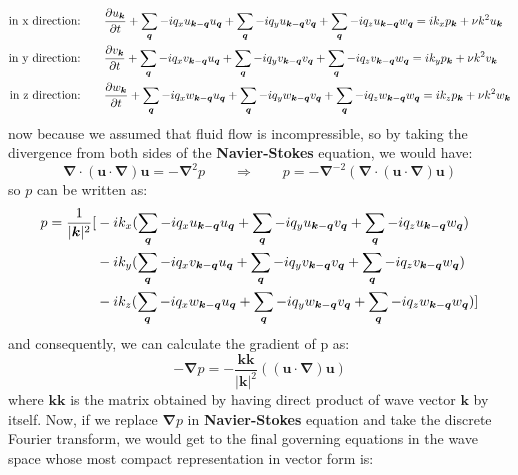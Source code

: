 \documentclass[10pt]{article}
\begin{document}
%
\begin{align}
\text{in x direction:}&\qquad \frac{\partial u_{\bm{k}}}{\partial t} + \sum_{\bm{q}}{-iq_{x}u_{\bm{k}-\bm{q}}u_{\bm{q}}} + \sum_{\bm{q}}{-iq_{y}u_{\bm{k}-\bm{q}}v_{\bm{q}}} + \sum_{\bm{q}}{-iq_{z}u_{\bm{k}-\bm{q}}w_{\bm{q}}} = ik_{x}p_{\bm{k}} + \nu k^2 u_{\bm{k}} \notag \\
\text{in y direction:}&\qquad \frac{\partial v_{\bm{k}}}{\partial t} + \sum_{\bm{q}}{-iq_{x}v_{\bm{k}-\bm{q}}u_{\bm{q}}} + \sum_{\bm{q}}{-iq_{y}v_{\bm{k}-\bm{q}}v_{\bm{q}}} + \sum_{\bm{q}}{-iq_{z}v_{\bm{k}-\bm{q}}w_{\bm{q}}} = ik_{y}p_{\bm{k}} + \nu k^2 v_{\bm{k}} \\
\text{in z direction:}&\qquad \frac{\partial w_{\bm{k}}}{\partial t} + \sum_{\bm{q}}{-iq_{x}w_{\bm{k}-\bm{q}}u_{\bm{q}}} + \sum_{\bm{q}}{-iq_{y}w_{\bm{k}-\bm{q}}v_{\bm{q}}} + \sum_{\bm{q}}{-iq_{z}w_{\bm{k}-\bm{q}}w_{\bm{q}}} = ik_{z}p_{\bm{k}} + \nu k^2 w_{\bm{k}} \notag
\end{align}
%
now because we assumed that fluid flow is incompressible, so by taking the divergence from both sides of the \textbf{Navier-Stokes} equation, we would have:
%
\begin{equation}
\bm{\nabla}\cdot(\bm{u}\cdot\bm{\nabla})\bm{u}=-\bm{\nabla}^2 p \qquad\Rightarrow\qquad p=-\bm{\nabla}^{-2}(\bm{\nabla}\cdot(\bm{u}\cdot\bm{\nabla})\bm{u})
\end{equation}
%
so $p$ can be written as:
%
\begin{align}
p=\frac{1}{|\bm{k}|^2}[&-ik_{x}(\sum_{\bm{q}}{-iq_{x}u_{\bm{k}-\bm{q}}u_{\bm{q}}} + \sum_{\bm{q}}{-iq_{y}u_{\bm{k}-\bm{q}}v_{\bm{q}}} + \sum_{\bm{q}}{-iq_{z}u_{\bm{k}-\bm{q}}w_{\bm{q}}}) \notag \\ 
&-ik_{y}(\sum_{\bm{q}}{-iq_{x}v_{\bm{k}-\bm{q}}u_{\bm{q}}} + \sum_{\bm{q}}{-iq_{y}v_{\bm{k}-\bm{q}}v_{\bm{q}}} + \sum_{\bm{q}}{-iq_{z}v_{\bm{k}-\bm{q}}w_{\bm{q}}})  \\
&-ik_{z}(\sum_{\bm{q}}{-iq_{x}w_{\bm{k}-\bm{q}}u_{\bm{q}}} + \sum_{\bm{q}}{-iq_{y}w_{\bm{k}-\bm{q}}v_{\bm{q}}} + \sum_{\bm{q}}{-iq_{z}w_{\bm{k}-\bm{q}}w_{\bm{q}}})] \notag
\end{align}
%
and consequently, we can calculate the gradient of p as:
%
\begin{equation}
-\bm{\nabla}p=-\frac{\bm{kk}}{|\bm{k}|^2}((\bm{u}\cdot\bm{\nabla})\bm{u})
\end{equation}
%
where $\bm{kk}$ is the matrix obtained by having direct product of wave vector $\bm{k}$ by itself. Now, if we replace $\bm{\nabla}p$ in \textbf{Navier-Stokes} equation and take the discrete Fourier transform, we would get to the final governing equations in the wave space whose most compact representation in vector form is:
\end{document}
